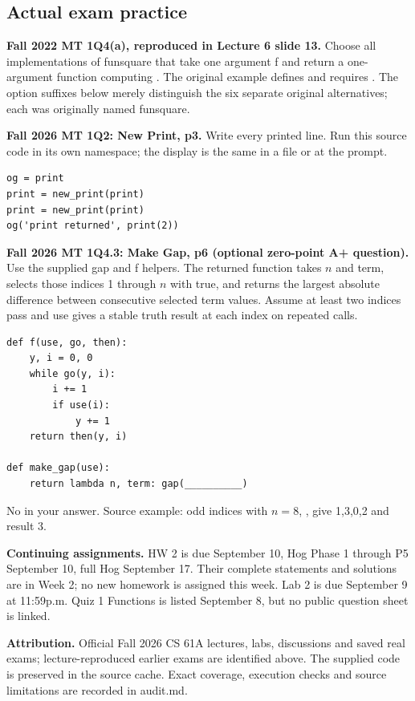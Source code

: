 \subsection{Actual exam practice}
\begin{prob}
\textbf{Fall 2022 MT 1Q4(a), reproduced in Lecture 6 slide 13.} Choose all implementations of funsquare that take one argument f and return a one-argument function computing . The original example defines  and requires . The option suffixes below merely distinguish the six separate original alternatives; each was originally named funsquare.
\end{prob}
\begin{prob}
\textbf{Fall 2026 MT 1Q2: New Print, p3.} Write every printed line. Run this source code in its own namespace; the display is the same in a file or at the prompt.
\begin{lstlisting}
og = print
print = new_print(print)
print = new_print(print)
og('print returned', print(2))
\end{lstlisting}
\end{prob}
\begin{prob}
\textbf{Fall 2026 MT 1Q4.3: Make Gap, p6 (optional zero-point A+ question).} Use the supplied gap and f helpers. The returned function takes $n$ and term, selects those indices 1 through $n$ with  true, and returns the largest absolute difference between consecutive selected term values. Assume at least two indices pass and use gives a stable truth result at each index on repeated calls.
\begin{lstlisting}
def f(use, go, then):
    y, i = 0, 0
    while go(y, i):
        i += 1
        if use(i):
            y += 1
    return then(y, i)

def make_gap(use):
    return lambda n, term: gap(__________)
\end{lstlisting}
No  in your answer. Source example: odd indices with $n=8$, , give 1,3,0,2 and result 3.\par
{}
\end{prob}
\textbf{Continuing assignments.} HW 2 is due September 10, Hog Phase 1 through P5 September 10, full Hog September 17. Their complete statements and solutions are in Week 2; no new homework is assigned this week. Lab 2 is due September 9 at 11:59p.m. Quiz 1 Functions is listed September 8, but no public question sheet is linked.

\textbf{Attribution.} Official Fall 2026 CS 61A lectures, labs, discussions and saved real exams; lecture-reproduced earlier exams are identified above. The supplied code is preserved in the source cache. Exact coverage, execution checks and source limitations are recorded in audit.md.
